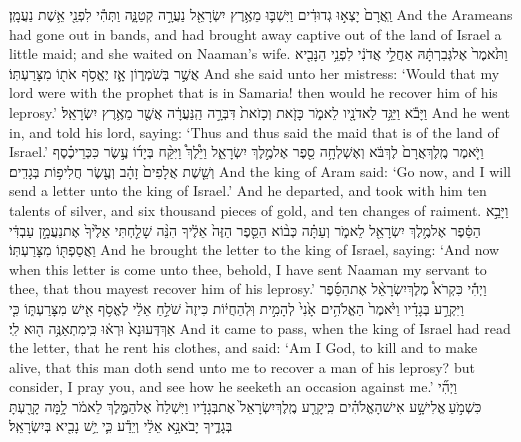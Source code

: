 {וַֽאֲרָם֙ יָצְא֣וּ גְדוּדִ֔ים וַיִּשְׁבּ֛וּ מֵאֶ֥רֶץ יִשְׂרָאֵ֖ל נַעֲרָ֣ה קְטַנָּ֑ה וַתְּהִ֕י לִפְנֵ֖י אֵ֥שֶׁת נַעֲמָֽן׃}
{And the Arameans had gone out in bands, and had brought away captive out of the land of Israel a little maid; and she waited on Naaman’s wife.}
{וַתֹּ֙אמֶר֙ אֶל\maqqaf גְּבִרְתָּ֔הּ אַחֲלֵ֣י אֲדֹנִ֔י לִפְנֵ֥י הַנָּבִ֖יא אֲשֶׁ֣ר בְּשֹׁמְר֑וֹן אָ֛ז יֶאֱסֹ֥ף אֹת֖וֹ מִצָּרַעְתּֽוֹ׃}
{And she said unto her mistress: ‘Would that my lord were with the prophet that is in Samaria! then would he recover him of his leprosy.’}
{וַיָּבֹ֕א וַיַּגֵּ֥ד לַאדֹנָ֖יו לֵאמֹ֑ר כָּזֹ֤את וְכָזֹאת֙ דִּבְּרָ֣ה הַֽנַּעֲרָ֔ה אֲשֶׁ֖ר מֵאֶ֥רֶץ יִשְׂרָאֵֽל׃}
{And he went in, and told his lord, saying: ‘Thus and thus said the maid that is of the land of Israel.’}
{וַיֹּ֤אמֶר מֶֽלֶךְ\maqqaf אֲרָם֙ לֶךְ\maqqaf בֹּ֔א וְאֶשְׁלְחָ֥ה סֵ֖פֶר אֶל\maqqaf מֶ֣לֶךְ יִשְׂרָאֵ֑ל וַיֵּ֩לֶךְ֩ וַיִּקַּ֨ח בְּיָד֜וֹ עֶ֣שֶׂר כִּכְּרֵי\maqqaf כֶ֗סֶף וְשֵׁ֤שֶׁת אֲלָפִים֙ זָהָ֔ב וְעֶ֖שֶׂר חֲלִיפ֥וֹת בְּגָדִֽים׃}
{And the king of Aram said: ‘Go now, and I will send a letter unto the king of Israel.’ And he departed, and took with him ten talents of silver, and six thousand pieces of gold, and ten changes of raiment.}
{וַיָּבֵ֣א הַסֵּ֔פֶר אֶל\maqqaf מֶ֥לֶךְ יִשְׂרָאֵ֖ל לֵאמֹ֑ר וְעַתָּ֗ה כְּב֨וֹא הַסֵּ֤פֶר הַזֶּה֙ אֵלֶ֔יךָ הִנֵּ֨ה שָׁלַ֤חְתִּי אֵלֶ֙יךָ֙ אֶת\maqqaf נַעֲמָ֣ן עַבְדִּ֔י וַאֲסַפְתּ֖וֹ מִצָּרַעְתּֽוֹ׃}
{And he brought the letter to the king of Israel, saying: ‘And now when this letter is come unto thee, behold, I have sent Naaman my servant to thee, that thou mayest recover him of his leprosy.’}
{וַיְהִ֡י כִּקְרֹא֩ מֶלֶךְ\maqqaf יִשְׂרָאֵ֨ל אֶת\maqqaf הַסֵּ֜פֶר וַיִּקְרַ֣ע בְּגָדָ֗יו וַיֹּ֙אמֶר֙ הַאֱלֹהִ֥ים אָ֙נִי֙ לְהָמִ֣ית וּֽלְהַחֲי֔וֹת כִּי\maqqaf זֶה֙ שֹׁלֵ֣חַ אֵלַ֔י לֶאֱסֹ֥ף אִ֖ישׁ מִצָּרַעְתּ֑וֹ כִּ֤י אַךְ\maqqaf דְּעוּ\maqqaf נָא֙ וּרְא֔וּ כִּֽי\maqqaf מִתְאַנֶּ֥ה ה֖וּא לִֽי׃}
{And it came to pass, when the king of Israel had read the letter, that he rent his clothes, and said: ‘Am I God, to kill and to make alive, that this man doth send unto me to recover a man of his leprosy? but consider, I pray you, and see how he seeketh an occasion against me.’}
{וַיְהִ֞י כִּשְׁמֹ֣עַ \legarmeh  אֱלִישָׁ֣ע אִישׁ\maqqaf הָאֱלֹהִ֗ים כִּֽי\maqqaf קָרַ֤ע מֶֽלֶךְ\maqqaf יִשְׂרָאֵל֙ אֶת\maqqaf בְּגָדָ֔יו וַיִּשְׁלַח֙ אֶל\maqqaf הַמֶּ֣לֶךְ לֵאמֹ֔ר לָ֥מָּה קָרַ֖עְתָּ בְּגָדֶ֑יךָ יָבֹא\maqqaf נָ֣א אֵלַ֔י וְיֵדַ֕ע כִּ֛י יֵ֥שׁ נָבִ֖יא בְּיִשְׂרָאֵֽל׃}
